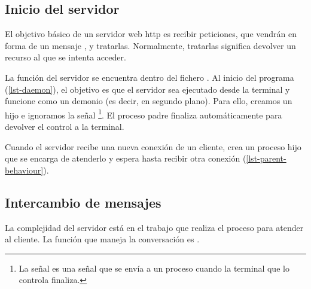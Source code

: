 \subsection{Inicio del servidor}
El objetivo básico de un servidor web http es recibir peticiones, que vendrán en forma de un mensaje , y tratarlas. Normalmente, tratarlas significa devolver un recurso al que se intenta acceder.

La función  del servidor se encuentra dentro del fichero . Al inicio del programa (\cref{lst-daemon}), el objetivo es que el servidor sea ejecutado desde la terminal y funcione como un demonio (es decir, en segundo plano). Para ello, creamos un hijo e ignoramos la señal %
\footnote{La señal  es una señal que se envía a un proceso cuando la terminal que lo controla finaliza.}.
El proceso padre finaliza automáticamente para devolver el control a la terminal.



Cuando el servidor recibe una nueva conexión {\TCP} de un cliente, crea un proceso hijo que se encarga de atenderlo y espera hasta recibir otra conexión (\cref{lst-parent-behaviour}).



\subsection{Intercambio de mensajes}
La complejidad del servidor está en el trabajo que realiza el proceso para atender al cliente. La función {\Clang} que maneja la conversación es .

